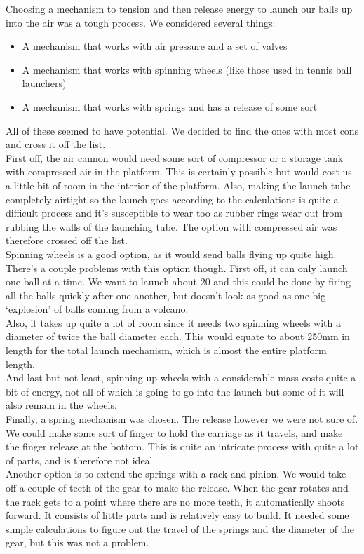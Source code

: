 \documentclass[11pt,twoside,a4paper]{report}
\begin{document}
Choosing a mechanism to tension and then release energy to launch our balls up into the air was a tough process. We considered several things:
\begin{itemize}
\item A mechanism that works with air pressure and a set of valves
\item A mechanism that works with spinning wheels (like those used in tennis ball launchers)
\item A mechanism that works with springs and has a release of some sort
\end{itemize}
All of these seemed to have potential. We decided to find the ones with most cons and cross it off the list.\\
First off, the air cannon would need some sort of compressor or a storage tank with compressed air in the platform. This is certainly possible but would cost us a little bit of room in the interior of the platform. Also, making the launch tube completely airtight so the launch goes according to the calculations is quite a difficult process and it\rq{}s susceptible to wear too as rubber rings wear out from rubbing the walls of the launching tube. The option with compressed air was therefore crossed off the list.\\
Spinning wheels is a good option, as it would send balls flying up quite high. There\rq{}s a couple problems with this option though. First off, it can only launch one ball at a time. We want to launch about 20 and this could be done by firing all the balls quickly after one another, but doesn\rq{}t look as good as one big \lq{}explosion\rq{} of balls coming from a volcano.\\
Also, it takes up quite a lot of room since it needs two spinning wheels with a diameter of twice the ball diameter each. This would equate to about 250mm in length for the total launch mechanism, which is almost the entire platform length.\\
And last but not least, spinning up wheels with a considerable mass costs quite a bit of energy, not all of which is going to go into the launch but some of it will also remain in the wheels.\\
Finally, a spring mechanism was chosen. The release however we were not sure of. We could make some sort of finger to hold the carriage as it travels, and make the finger release at the bottom. This is quite an intricate process with quite a lot of parts, and is therefore not ideal.\\
Another option is to extend the springs with a rack and pinion. We would take off a couple of teeth of the gear to make the release. When the gear rotates and the rack gets to a point where there are no more teeth, it automatically shoots forward. It consists of little parts and is relatively easy to build. It needed some simple calculations to figure out the travel of the springs and the diameter of the gear, but this was not a problem.\\
\end{document}
